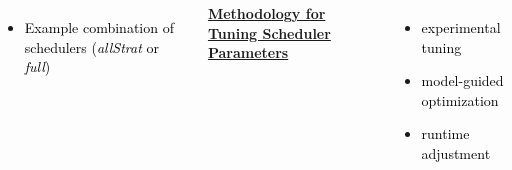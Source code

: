 \begin{frame}
\begin{columns}
\begin{itemize}
           \item \tiny \textcolor{black}{{Example combination of schedulers (\textit{allStrat} or \textit{full}) }}
           \end{itemize}
               {\tiny \underline{\textbf {Methodology for Tuning Scheduler Parameters}}}
        \begin{itemize}
          \tiny \item \tiny \textcolor{black} {experimental tuning}
        \item \tiny \textcolor{black} {model-guided optimization} %
        \item \tiny \textcolor{black} {runtime adjustment} %
        \end{itemize}
\end{columns}
\end{frame}

